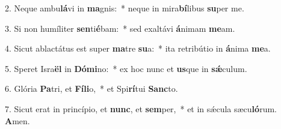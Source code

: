 2. Neque ambu\textbf{lá}vi in \textbf{ma}gnis:~*  neque in mira\textbf{bí}libus \textbf{su}per me.\

3. Si non humíliter \textbf{sen}ti\textbf{é}bam:~*  sed exaltávi \textbf{á}nimam \textbf{me}am.\

4. Sicut ablactátus est super \textbf{ma}tre \textbf{su}a:~*  ita retribútio in \textbf{á}nima \textbf{me}a.\

5. Speret Isra\textbf{ël} in \textbf{Dó}\textbf{mi}no:~*  ex hoc nunc et \textbf{us}que in \textbf{sǽ}culum.\

6. Glória \textbf{Pa}tri, et \textbf{Fí}\textbf{li}o,~*  et Spi\textbf{rí}tui \textbf{Sanc}to.\

7. Sicut erat in princípio, et \textbf{nunc}, et \textbf{sem}per,~*  et in sǽcula sæcu\textbf{ló}rum. \textbf{A}men.\

